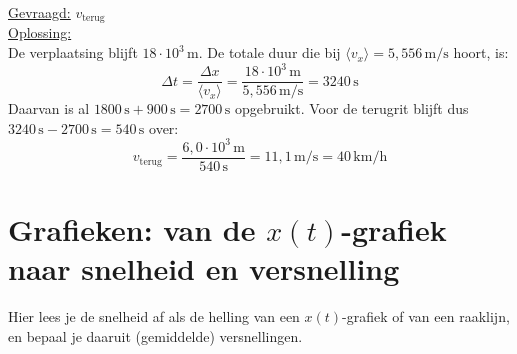 \documentclass{ximera}
\begin{document}
\begin{exercise}
\begin{question}
\begin{solution}
            \underline{Gevraagd:} $v_{\text{terug}}$\\

            \underline{Oplossing:}\\
            De verplaatsing blijft $18 \cdot 10^{3} \, \mathrm{m}$. De totale duur die bij $\langle v_x \rangle = 5{,}556 \, \mathrm{m/s}$ hoort, is:
            \[
                \Delta t = \frac{\Delta x}{\langle v_x \rangle} = \frac{18 \cdot 10^{3} \, \mathrm{m}}{5{,}556 \, \mathrm{m/s}} = 3240 \, \mathrm{s}
            \]
            Daarvan is al $1800 \, \mathrm{s} + 900 \, \mathrm{s} = 2700 \, \mathrm{s}$ opgebruikt. Voor de terugrit blijft dus $3240 \, \mathrm{s} - 2700 \, \mathrm{s} = 540 \, \mathrm{s}$ over:
            \[
                v_{\text{terug}} = \frac{6{,}0 \cdot 10^{3} \, \mathrm{m}}{540 \, \mathrm{s}} = 11{,}1 \, \mathrm{m/s} = \boxed{40 \, \mathrm{km/h}}
            \]
        \end{solution}
    \end{question}
\end{exercise}
\section{Grafieken: van de $x(t)$-grafiek naar snelheid en versnelling}
Hier lees je de snelheid af als de helling van een $x(t)$-grafiek of van een raaklijn, en bepaal je daaruit (gemiddelde) versnellingen.
\end{document}
